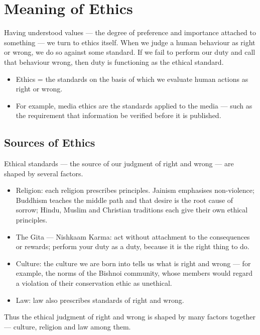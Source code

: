 \section{Meaning of Ethics}

Having understood values --- the degree of preference and importance attached to something --- we turn to ethics itself. When we judge a human behaviour as right or wrong, we do so against some standard. If we fail to perform our duty and call that behaviour wrong, then duty is functioning as the ethical standard.

\begin{KeyConcept}
\begin{itemize}
\item Ethics = the standards on the basis of which we evaluate human actions as right or wrong.
\item For example, media ethics are the standards applied to the media --- such as the requirement that information be verified before it is published.
\end{itemize}
\end{KeyConcept}

\subsection{Sources of Ethics}

Ethical standards --- the source of our judgment of right and wrong --- are shaped by several factors.

\begin{itemize}
\item Religion: each religion prescribes principles. Jainism emphasises non-violence; Buddhism teaches the middle path and that desire is the root cause of sorrow; Hindu, Muslim and Christian traditions each give their own ethical principles.
\item The Gita --- Nishkaam Karma: act without attachment to the consequences or rewards; perform your duty as a duty, because it is the right thing to do.
\item Culture: the culture we are born into tells us what is right and wrong --- for example, the norms of the Bishnoi community, whose members would regard a violation of their conservation ethic as unethical.
\item Law: law also prescribes standards of right and wrong.
\end{itemize}

Thus the ethical judgment of right and wrong is shaped by many factors together --- culture, religion and law among them.

